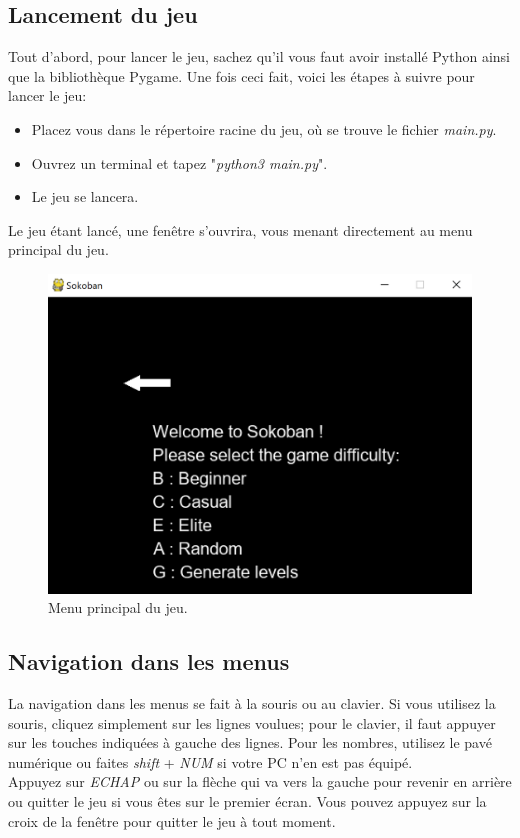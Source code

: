 \documentclass[a4paper,12pt]{article}
\begin{document}
\subsection{Lancement du jeu}

Tout d'abord, pour lancer le jeu, sachez qu'il vous faut avoir installé Python ainsi que la bibliothèque Pygame.
Une fois ceci fait, voici les étapes à suivre pour lancer le jeu:\\
\begin{itemize}
    \item Placez vous dans le répertoire racine du jeu, où se trouve le fichier \textit{main.py}.
    \item Ouvrez un terminal et tapez "\textit{python3 main.py}".
    \item  Le jeu se lancera.
\end{itemize} 
Le jeu étant lancé, une fenêtre s'ouvrira, vous menant directement au menu principal du jeu.\\
\begin{figure}[H]
\begin{center}
\includegraphics{./Illustrations/menu.png}
\caption{Menu principal du jeu.}
\end{center}
\end{figure}

\subsection{Navigation dans les menus}

La navigation dans les menus se fait à la souris ou au clavier. Si vous utilisez la souris, cliquez simplement sur les lignes voulues; pour le clavier, il faut appuyer sur les touches indiquées à gauche des lignes. Pour les nombres, utilisez le pavé numérique ou faites \textit{shift} + \textit{NUM} si votre PC n'en est pas équipé.\\
Appuyez sur \textit{ECHAP} ou sur la flèche qui va vers la gauche pour revenir en arrière ou quitter le jeu si vous êtes sur le premier écran. Vous pouvez appuyez sur la croix de la fenêtre pour quitter le jeu à tout moment.
\end{document}
